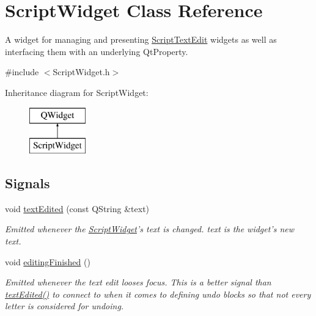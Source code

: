 \hypertarget{class_script_widget}{\section{Script\-Widget Class Reference}
\label{class_script_widget}
}


A widget for managing and presenting \hyperlink{class_script_text_edit}{Script\-Text\-Edit} widgets as well as interfacing them with an underlying Qt\-Property.  




{\ttfamily \#include $<$Script\-Widget.\-h$>$}

Inheritance diagram for Script\-Widget\-:\begin{figure}[H]
\begin{center}
\leavevmode
\includegraphics[height=2.000000cm]{class_script_widget}
\end{center}
\end{figure}
\subsection*{Signals}
\begin{DoxyCompactItemize}
\item 
\hypertarget{class_script_widget_a87b0b6c6b19655367ad8888d8198e353}{void \hyperlink{class_script_widget_a87b0b6c6b19655367ad8888d8198e353}{text\-Edited} (const Q\-String \&text)}\label{class_script_widget_a87b0b6c6b19655367ad8888d8198e353}

\begin{DoxyCompactList}\small\item\em Emitted whenever the \hyperlink{class_script_widget}{Script\-Widget}'s text is changed. text is the widget's new text. \end{DoxyCompactList}\item 
\hypertarget{class_script_widget_ab52ac6b09578b0423fefec508959c3c6}{void \hyperlink{class_script_widget_ab52ac6b09578b0423fefec508959c3c6}{editing\-Finished} ()}\label{class_script_widget_ab52ac6b09578b0423fefec508959c3c6}

\begin{DoxyCompactList}\small\item\em Emitted whenever the text edit looses focus. This is a better signal than \hyperlink{class_script_widget_a87b0b6c6b19655367ad8888d8198e353}{text\-Edited()} to connect to when it comes to defining undo blocks so that not every letter is considered for undoing. \end{DoxyCompactList}\end{DoxyCompactItemize}
